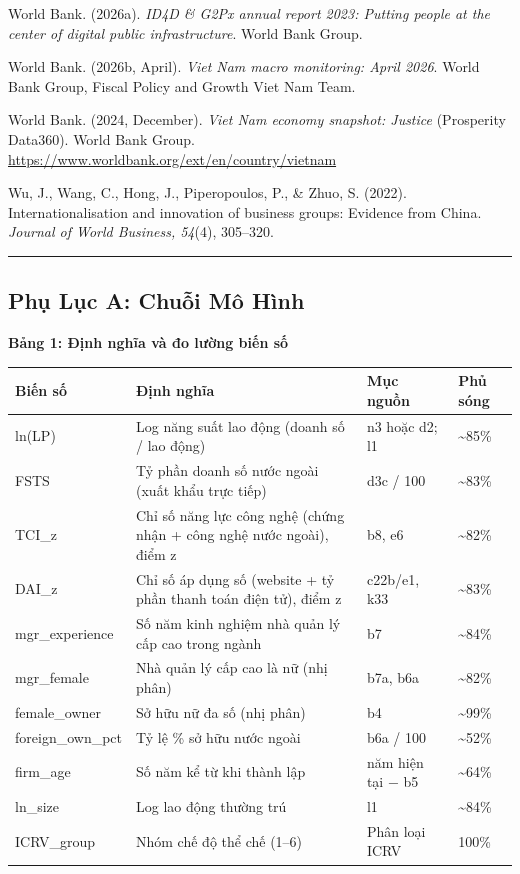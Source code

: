 \documentclass[12pt,a4paper]{article}
\begin{document}
World Bank. (2026a). \emph{ID4D \& G2Px annual report 2023: Putting
people at the center of digital public infrastructure}. World Bank
Group.

World Bank. (2026b, April). \emph{Viet Nam macro monitoring: April
2026}. World Bank Group, Fiscal Policy and Growth Viet Nam Team.

World Bank. (2024, December). \emph{Viet Nam economy snapshot: Justice}
(Prosperity Data360). World Bank Group.
\url{https://www.worldbank.org/ext/en/country/vietnam}

Wu, J., Wang, C., Hong, J., Piperopoulos, P., \& Zhuo, S. (2022).
Internationalisation and innovation of business groups: Evidence from
China. \emph{Journal of World Business, 54}(4), 305--320.

\begin{center}\rule{0.5\linewidth}{0.5pt}\end{center}

\hypertarget{phux1ee5-lux1ee5c-a-chuux1ed7i-muxf4-huxecnh}{%
\subsection{Phụ Lục A: Chuỗi Mô
Hình}\label{phux1ee5-lux1ee5c-a-chuux1ed7i-muxf4-huxecnh}}

\textbf{Bảng 1: Định nghĩa và đo lường biến số}

\begin{longtable}[]{@{}llll@{}}
\toprule\noalign{}
Biến số & Định nghĩa & Mục nguồn & Phủ sóng \\
\midrule\noalign{}
\endhead
\bottomrule\noalign{}
\endlastfoot
ln(LP) & Log năng suất lao động (doanh số / lao động) & n3 hoặc d2; l1 &
\textasciitilde85\% \\
FSTS & Tỷ phần doanh số nước ngoài (xuất khẩu trực tiếp) & d3c / 100 &
\textasciitilde83\% \\
TCI\_z & Chỉ số năng lực công nghệ (chứng nhận + công nghệ nước ngoài),
điểm z & b8, e6 & \textasciitilde82\% \\
DAI\_z & Chỉ số áp dụng số (website + tỷ phần thanh toán điện tử), điểm
z & c22b/e1, k33 & \textasciitilde83\% \\
mgr\_experience & Số năm kinh nghiệm nhà quản lý cấp cao trong ngành &
b7 & \textasciitilde84\% \\
mgr\_female & Nhà quản lý cấp cao là nữ (nhị phân) & b7a, b6a &
\textasciitilde82\% \\
female\_owner & Sở hữu nữ đa số (nhị phân) & b4 & \textasciitilde99\% \\
foreign\_own\_pct & Tỷ lệ \% sở hữu nước ngoài & b6a / 100 &
\textasciitilde52\% \\
firm\_age & Số năm kể từ khi thành lập & năm hiện tại − b5 &
\textasciitilde64\% \\
ln\_size & Log lao động thường trú & l1 & \textasciitilde84\% \\
ICRV\_group & Nhóm chế độ thể chế (1--6) & Phân loại ICRV & 100\% \\
\end{longtable}
\end{document}
